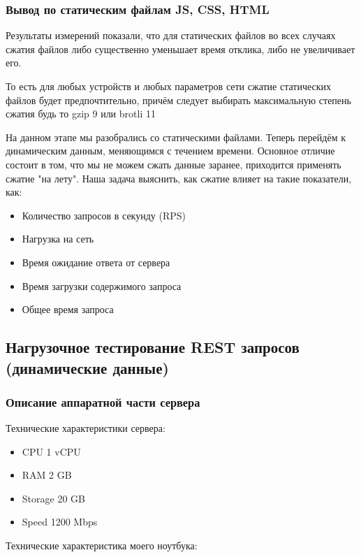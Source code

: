 \documentclass[12pt]{article}
\begin{document}
\subsubsection{Вывод по статическим файлам JS, CSS, HTML}

Результаты измерений показали, что для статических файлов во всех случаях сжатия файлов либо существенно уменьшает время отклика, либо не увеличивает его.

То есть для любых устройств и любых параметров сети сжатие статических файлов будет предпочтительно, причём следует выбирать максимальную степень сжатия будь то gzip 9 или brotli 11

На данном этапе мы разобрались со статическими файлами. Теперь перейдём к динамическим данным, меняющимся с течением времени. Основное отличие состоит в том, что мы не можем сжать данные заранее, приходится применять сжатие "на лету". Наша задача  выяснить, как сжатие влияет на такие показатели, как:

\begin{itemize}
    \item Количество запросов в секунду (RPS)
    \item Нагрузка на сеть
    \item Время ожидание ответа от сервера
    \item Время загрузки содержимого запроса
    \item Общее время запроса
\end{itemize}

\subsection{Нагрузочное тестирование REST запросов (динамические данные)}

\subsubsection{Описание аппаратной части сервера}

Технические характеристики сервера:

\begin{itemize}
    \item CPU 1 vCPU
    \item RAM 2 GB
    \item Storage 20 GB
    \item Speed 1200 Mbps
\end{itemize}

Технические характеристика моего ноутбука:
\end{document}
